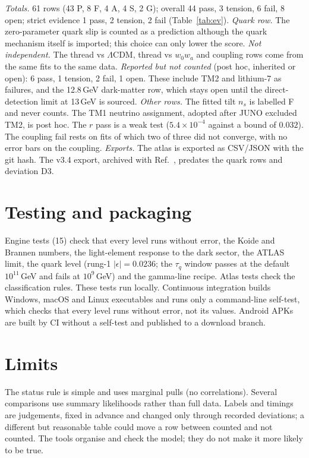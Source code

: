 \documentclass[aps,prd,twocolumn,superscriptaddress,nofootinbib,showkeys]{revtex4-2}
\begin{document}
\textit{Totals.} 61 rows (43 P, 8 F, 4 A, 4 S, 2 G); overall 44 pass, 3 tension, 6 fail, 8 open; strict evidence 1 pass, 2 tension, 2 fail (Table~\ref{tab:ev}).
\textit{Quark row.} The zero-parameter quark slip is counted as a prediction although the quark mechanism itself is imported; this choice can only lower the score. \textit{Not independent.} The thread vs $\Lambda$CDM, thread vs $w_0w_a$ and coupling rows come from the same fits to the same data.
\textit{Reported but not counted} (post hoc, inherited or open): 6 pass, 1 tension, 2 fail, 1 open. These include TM2 and lithium-7 as failures, and the 12.8\,GeV dark-matter row, which stays open until the direct-detection limit at 13\,GeV is sourced.
\textit{Other rows.} The fitted tilt $n_s$ is labelled F and never counts. The TM1 neutrino assignment, adopted after JUNO excluded TM2, is post hoc. The $r$ pass is a weak test ($5.4\times10^{-4}$ against a bound of $0.032$). The coupling fail rests on fits of which two of three did not converge, with no error bars on the coupling.
\textit{Exports.} The atlas is exported as CSV/JSON with the git hash. The v3.4 export, archived with Ref.~\cite{P3}, predates the quark rows and deviation D3.

\section{Testing and packaging}
Engine tests (15) check that every level runs without error, the Koide and Brannen numbers, the light-element response to the dark sector, the ATLAS limit, the quark level (rung-1 $|\epsilon|=0.0236$; the $\tau_q$ window passes at the default $10^{11}$\,GeV and fails at $10^9$\,GeV) and the gamma-line recipe. Atlas tests check the classification rules. These tests run locally. Continuous integration builds Windows, macOS and Linux executables and runs only a command-line self-test, which checks that every level runs without error, not its values. Android APKs are built by CI without a self-test and published to a download branch.

\section{Limits}
The status rule is simple and uses marginal pulls (no correlations). Several comparisons use summary likelihoods rather than full data. Labels and timings are judgements, fixed in advance and changed only through recorded deviations; a different but reasonable table could move a row between counted and not counted. The tools organise and check the model; they do not make it more likely to be true.
\end{document}
